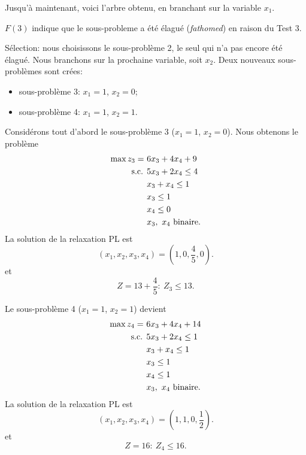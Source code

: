\begin{example}[suite]
Jusqu'à maintenant, voici l'arbre obtenu, en branchant sur la variable $x_1$.
\begin{center}
\end{center}
$F(3)$ indique que le sous-probleme a été élagué ({\sl fathomed}) en raison du Test 3.

Sélection: nous choisissons le sous-problème 2, le seul qui n'a pas encore été élagué.
Nous branchons sur la prochaine variable, soit $x_2$.
Deux nouveaux sous-problèmes sont crées:
\begin{itemize}
\item
sous-problème 3: $x_1 = 1$, $x_2 = 0$;
\item
sous-problème 4: $x_1 = 1$, $x_2 = 1$.
\end{itemize}

Considérons tout d'abord le sous-problème 3 ($x_1 = 1$, $x_2 = 0$).
Nous obtenons le problème
\begin{align*}
\max z_3 =\ & 6x_3 + 4x_4 + 9 \\
\mbox{s.c. }{} & 5 x_3 + 2x_4 \leq 4 \\
& x_3 + x_4 \leq 1 \\
& x_3 \leq 1 \\
& x_4 \leq 0 \\
& x_3,\ x_4 \mbox{ binaire}.
\end{align*}
La solution de la relaxation PL est
\[
( x_1, x_2, x_3, x_4) = \left(1,0, \frac{4}{5},0 \right).
\]
 et
 \[
Z = 13+\frac{4}{5}:\ Z_3 \leq 13.
 \]
 
Le sous-problème 4 ($x_1 = 1$, $x_2 = 1$) devient
\begin{align*}
\max z_4 =\ & 6x_3 + 4x_4 + 14 \\
\mbox{s.c. }{} & 5 x_3 + 2x_4 \leq 1 \\
& x_3 + x_4 \leq 1 \\
& x_3 \leq 1 \\
& x_4 \leq 1 \\
& x_3,\ x_4 \mbox{ binaire}.
\end{align*}
La solution de la relaxation PL est
\[
( x_1, x_2, x_3, x_4) = \left(1,1,0, \frac{1}{2} \right).
\]
 et
 \[
Z = 16:\ Z_4 \leq 16.
 \]


\end{example}
